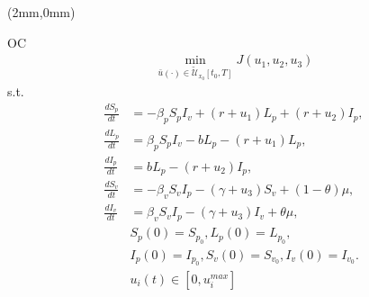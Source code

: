 	\begin{frame}[plain]
		\begin{textblock*}{120mm}(2mm,0mm)
			\begin{yellowbox}{OC}
				\begin{align*}
				\min_{\bar{u}(\cdot)\in \tilde{\mathcal{U}}_{x_0}[t_0,T]}J(u_1,u_2,u_3)
				\end{align*}
				s.t.
				\begin{equation*}
					\begin{aligned}
						\frac{dS_p}{dt} &=
						 -\beta_p S_p I_v +(r +u_1)L_p + (r + u_2) I_p,
						 \\
						\frac{dL_p}{dt} &=
						\beta_p S_p I_v -b L_p -(r + u_1)L_p,
						\\
						\frac{dI_p}{dt} &= 
						b L_p - (r + u_2) I_p,
						\\
						\frac{dS_v}{dt} &=
						-\beta_v S_v I_p - (\gamma+u_3) S_v +(1-\theta)\mu,
						\\
						\frac{dI_v}{dt} &=
						\beta_v S_v I_p -(\gamma+u_3) I_v +\theta\mu,
						\\
						&S_p(0) = S_{p_0}, L_p(0) = L_{p_0},
						\\
						&I_p(0) = I_{p_0},S_v(0) = S_{v_0}, I_v(0) = I_{v_0}.
						\\
						&u_i(t)\in[0,u_i^{max}]
						\end{aligned}%
				\end{equation*}
			\end{yellowbox}
		\end{textblock*}
	\end{frame}
